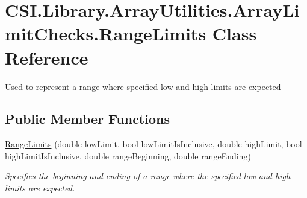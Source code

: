 \hypertarget{class_c_s_i_1_1_library_1_1_array_utilities_1_1_array_limit_checks_1_1_range_limits}{}\section{C\+S\+I.\+Library.\+Array\+Utilities.\+Array\+Limit\+Checks.\+Range\+Limits Class Reference}
\label{class_c_s_i_1_1_library_1_1_array_utilities_1_1_array_limit_checks_1_1_range_limits}


Used to represent a range where specified low and high limits are expected  


\subsection*{Public Member Functions}
\begin{DoxyCompactItemize}
\item 
\mbox{\hyperlink{class_c_s_i_1_1_library_1_1_array_utilities_1_1_array_limit_checks_1_1_range_limits_a2073071423e6fa0a1026249c823f3b5f}{Range\+Limits}} (double low\+Limit, bool low\+Limit\+Is\+Inclusive, double high\+Limit, bool high\+Limit\+Is\+Inclusive, double range\+Beginning, double range\+Ending)
\begin{DoxyCompactList}\small\item\em Specifies the beginning and ending of a range where the specified low and high limits are expected. \end{DoxyCompactList}\end{DoxyCompactItemize}

